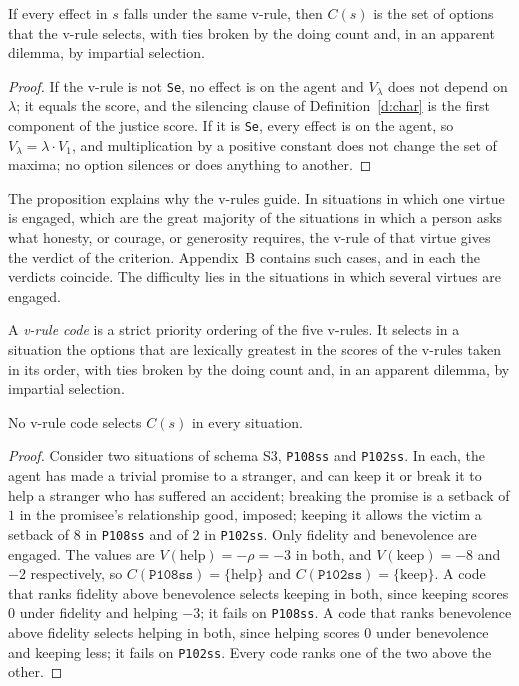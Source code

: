 \documentclass{situationist-preprint}
\newcommand{\Ch}{C}
\begin{document}
\begin{proposition}\label{p:vrules}
If every effect in $s$ falls under the same v-rule, then $\Ch(s)$ is the set of options that the v-rule selects, with ties broken by the doing count and, in an apparent dilemma, by impartial selection.
\end{proposition}

\begin{proof}
If the v-rule is not \texttt{Se}, no effect is on the agent and $V_\lambda$ does not depend on $\lambda$; it equals the score, and the silencing clause of Definition~\ref{d:char} is the first component of the justice score. If it is \texttt{Se}, every effect is on the agent, so $V_\lambda=\lambda\cdot V_1$, and multiplication by a positive constant does not change the set of maxima; no option silences or does anything to another.
\end{proof}

The proposition explains why the v-rules guide. In situations in which one virtue is engaged, which are the great majority of the situations in which a person asks what honesty, or courage, or generosity requires, the v-rule of that virtue gives the verdict of the criterion. Appendix~B contains \stnsingle{} such cases, and in each the verdicts coincide. The difficulty lies in the situations in which several virtues are engaged.

\begin{definition}\label{d:code}
A \emph{v-rule code} is a strict priority ordering of the five v-rules. It selects in a situation the options that are lexically greatest in the scores of the v-rules taken in its order, with ties broken by the doing count and, in an apparent dilemma, by impartial selection.
\end{definition}

\begin{theorem}\label{t:uncod}
No v-rule code selects $\Ch(s)$ in every situation.
\end{theorem}

\begin{proof}
Consider two situations of schema S3, \texttt{P108ss} and \texttt{P102ss}. In each, the agent has made a trivial promise to a stranger, and can keep it or break it to help a stranger who has suffered an accident; breaking the promise is a setback of $1$ in the promisee's relationship good, imposed; keeping it allows the victim a setback of $8$ in \texttt{P108ss} and of $2$ in \texttt{P102ss}. Only fidelity and benevolence are engaged. The values are $V(\text{help})=-\rho=-3$ in both, and $V(\text{keep})=-8$ and $-2$ respectively, so $\Ch(\texttt{P108ss})=\{\text{help}\}$ and $\Ch(\texttt{P102ss})=\{\text{keep}\}$. A code that ranks fidelity above benevolence selects keeping in both, since keeping scores $0$ under fidelity and helping $-3$; it fails on \texttt{P108ss}. A code that ranks benevolence above fidelity selects helping in both, since helping scores $0$ under benevolence and keeping less; it fails on \texttt{P102ss}. Every code ranks one of the two above the other.
\end{proof}
\end{document}
